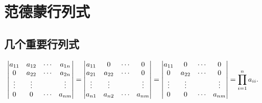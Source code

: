 \documentclass[lang=cn,10pt]{elegantbook}
\begin{document}
\section{范德蒙行列式}
\subsection{几个重要行列式}
\begin{theorem}[主对角线三角行列式] \label{thm:zdjxhls} 
\begin{equation}
   \label{eq:zdjxhls}
   \begin{vmatrix}
       a_{11}&a_{12}&\cdots&a_{1n}\\
       0&a_{22}&\cdots&a_{2n}\\
       \vdots&\vdots& &\vdots\\
       0&0&\cdots&a_{nm}
   \end{vmatrix}=
   \begin{vmatrix}
       a_{11}&0&\cdots&0\\
       a_{21}&a_{22}&\cdots&0\\
       \vdots&\vdots& &\vdots\\
       a_{n1}&a_{n2}&\cdots&a_{nm}
   \end{vmatrix}=
   \begin{vmatrix}
       a_{11}&0&\cdots&0\\
       0&a_{22}&\cdots&0\\
       \vdots&\vdots& &\vdots\\
       0&0&\cdots&a_{nm}
   \end{vmatrix}=\prod\limits_{i=1}^{n}a_{ii}.\\
\end{equation}
\end{theorem}
\end{document}

